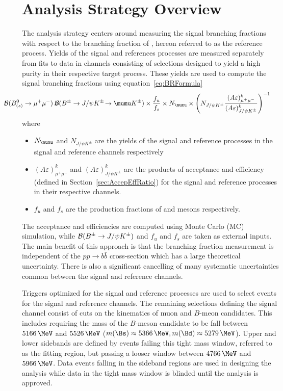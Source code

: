 \section{Analysis Strategy Overview}
\label{sec:StrategyOverview}


The analysis strategy centers around measuring the signal branching fractions with respect to the branching fraction of \BpmKpmJpsi, hereon referred to as the reference process.  
Yields of the signal and references processes are measured separately from fits to data in channels consisting of selections designed to yield a high purity in their respective target process. 
These yields are used to compute the signal branching fractions using equation~\ref{eq:BRFormula} 
\begin{eqnarray}
  \hbox{\hspace{-1cm}} \BR (\Bmumu)=&
  \hbox{\hspace{-3mm}}\BR (\BpmKpmJpsi\! \to \mumu K^\pm)\times
  \frac{f_{u}}{f_{s}}\times N_{\mumu}\times \left( N_{J/\psi K^\pm} \theInvRhok \right)^{-1}\,
  \label{eq:BRFormula}
\end{eqnarray}
where 
\begin{itemize}
  \item $N_{\mumu}$ and $N_{J/\psi K^\pm}$ are the yields of the signal and reference processes in the signal and reference channels respectively
  \item $(A\varepsilon)^k_{\mu^+\mu^-}$ and $(A\varepsilon)^k_{J/\psi K^\pm}$ are the products of acceptance and efficiency (defined in Section~\ref{sec:AccepEffRatio}) for the signal and reference processes in their respective channels. 
  \item $f_{u}$ and $f_{s}$ are the production fractions of \Bp and \Bs mesons respectively.
\end{itemize}
The acceptance and efficiencies are computed using Monte Carlo (MC) simulation, while ${\cal B} (B^\pm \to J/\psi K^\pm)$ and $f_{u}$ and $f_{s}$ are taken as external inputs. 
The main benefit of this approach is that the branching fraction measurement is independent of the $p p \rightarrow b\bar{b}$ cross-section which has a large theoretical uncertainty. 
There is also a significant cancelling of many systematic uncertainties common between the signal and reference channels. 

Triggers optimized for the signal and reference processes are used to select events for the signal and reference channels. 
The remaining selections defining the signal channel consist of cuts on the kinematics of muon and $B$-meon candidates. 
This includes requiring the mass of the $B$-meson candidate to be fall between $5166\,\MeV$ and $5526\,\MeV$ ($m(\Bs)\approx 5366\,\MeV, m(\Bd)\approx 5279\,\MeV$).  
Upper and lower sidebands are defined by events failing this tight mass window, referred to as the fitting region, but passing a looser window between $4766\,\MeV$ and $5966\,\MeV$.
Data events falling in the sideband regions are used in designing the analysis while data in the tight mass window is blinded until the analysis is approved.  


